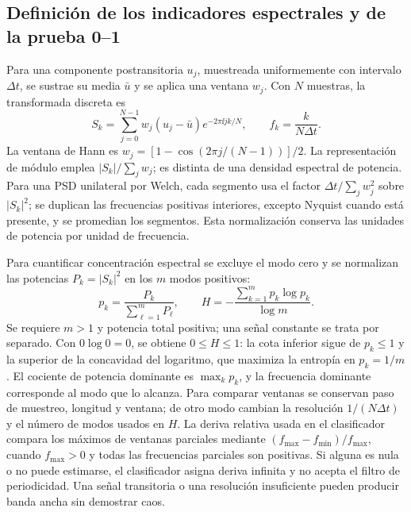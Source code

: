 \subsection{Definición de los indicadores espectrales y de la prueba 0--1}
\label{bre:diag:definition}

Para una componente postransitoria $u_j$, muestreada uniformemente con
intervalo $\Delta t$, se sustrae su media $\bar u$ y se aplica una ventana
$w_j$. Con $N$ muestras, la transformada discreta es
\begin{equation}
 S_k=\sum_{j=0}^{N-1}w_j(u_j-\bar u)e^{-2\pi\ii jk/N},
 \qquad f_k=\frac{k}{N\Delta t}.
 \label{bre:diag:dft}
\end{equation}
La ventana de Hann es $w_j=[1-\cos(2\pi j/(N-1))]/2$.
La representación de módulo emplea $|S_k|/\sum_jw_j$; es distinta de
una densidad espectral de potencia. Para una PSD unilateral por Welch,
cada segmento usa el factor $\Delta t/\sum_jw_j^2$ sobre $|S_k|^2$;
se duplican las frecuencias positivas interiores, excepto Nyquist
cuando está presente, y se promedian los segmentos. Esta normalización
conserva las unidades de potencia por unidad de frecuencia.

Para cuantificar concentración espectral se excluye el modo cero y se
normalizan las potencias $P_k=|S_k|^2$ en los $m$ modos positivos:
\begin{equation}
 p_k=\frac{P_k}{\sum_{\ell=1}^mP_\ell},\qquad
 H=-\frac{\sum_{k=1}^mp_k\log p_k}{\log m}.
 \label{bre:diag:entropy}
\end{equation}
Se requiere $m>1$ y potencia total positiva; una señal constante se trata
por separado. Con $0\log0=0$, se obtiene $0\le H\le1$:
la cota inferior sigue de $p_k\le1$ y la superior de la concavidad del
logaritmo, que maximiza la entropía en $p_k=1/m$.
El cociente de potencia dominante es $\max_kp_k$, y la frecuencia
dominante corresponde al modo que lo alcanza. Para comparar ventanas se
conservan paso de muestreo, longitud y ventana; de otro modo cambian la
resolución $1/(N\Delta t)$ y el número de modos usados en $H$.
La deriva relativa usada en el clasificador compara los máximos de
ventanas parciales mediante $(f_{\max}-f_{\min})/f_{\max}$, cuando
$f_{\max}>0$ y todas las frecuencias parciales son positivas. Si alguna
es nula o no puede estimarse, el clasificador asigna deriva infinita y
no acepta el filtro de periodicidad. Una señal transitoria o una resolución insuficiente pueden
producir banda ancha sin demostrar caos.


